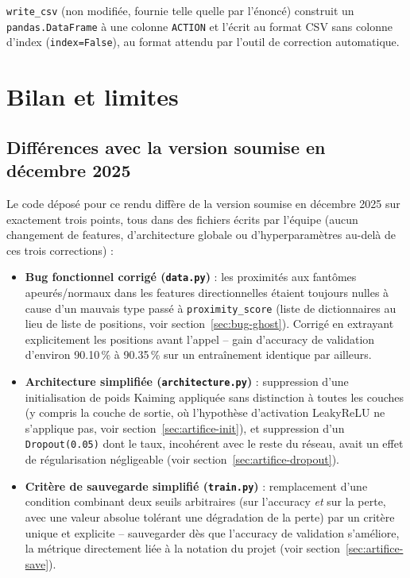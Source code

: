 \documentclass[a4paper,12pt]{article}
\begin{document}
\texttt{write\_csv} (non modifiée, fournie telle quelle par l'énoncé)
construit un \texttt{pandas.DataFrame} à une colonne \texttt{ACTION} et
l'écrit au format CSV sans colonne d'index
(\texttt{index=False}), au format attendu par l'outil de correction
automatique.

\newpage
\section{Bilan et limites}

\subsection{Différences avec la version soumise en décembre 2025}

Le code déposé pour ce rendu diffère de la version soumise en décembre
2025 sur exactement trois points, tous dans des fichiers écrits par
l'équipe (aucun changement de features, d'architecture globale ou
d'hyperparamètres au-delà de ces trois corrections) :

\begin{itemize}
    \item \textbf{Bug fonctionnel corrigé (\texttt{data.py})} : les
    proximités aux fantômes apeurés/normaux dans les features
    directionnelles étaient toujours nulles à cause d'un mauvais type
    passé à \texttt{proximity\_score} (liste de dictionnaires au lieu de
    liste de positions, voir section~\ref{sec:bug-ghost}). Corrigé en
    extrayant explicitement les positions avant l'appel -- gain
    d'accuracy de validation d'environ 90.10\,\% à 90.35\,\% sur un
    entraînement identique par ailleurs.
    \item \textbf{Architecture simplifiée (\texttt{architecture.py})} :
    suppression d'une initialisation de poids Kaiming appliquée sans
    distinction à toutes les couches (y compris la couche de sortie, où
    l'hypothèse d'activation LeakyReLU ne s'applique pas, voir
    section~\ref{sec:artifice-init}), et suppression d'un
    \texttt{Dropout(0.05)} dont le taux, incohérent avec le reste du
    réseau, avait un effet de régularisation négligeable (voir
    section~\ref{sec:artifice-dropout}).
    \item \textbf{Critère de sauvegarde simplifié (\texttt{train.py})} :
    remplacement d'une condition combinant deux seuils arbitraires (sur
    l'accuracy \emph{et} sur la perte, avec une valeur absolue tolérant
    une dégradation de la perte) par un critère unique et explicite --
    sauvegarder dès que l'accuracy de validation s'améliore, la métrique
    directement liée à la notation du projet (voir
    section~\ref{sec:artifice-save}).
\end{itemize}
\end{document}
